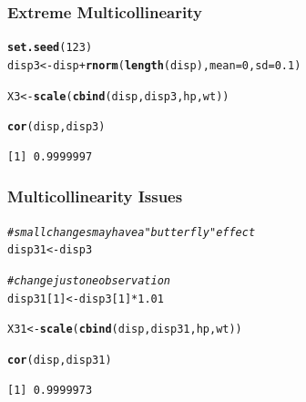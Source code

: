 \documentclass[12pt]{beamer}\usepackage[]{graphicx}\usepackage[]{color}
\makeatletter
\newcommand{\hlnum}[1]{\textcolor[rgb]{0.686,0.059,0.569}{#1}}%
\newcommand{\hlcom}[1]{\textcolor[rgb]{0.678,0.584,0.686}{\textit{#1}}}%
\newcommand{\hlopt}[1]{\textcolor[rgb]{0,0,0}{#1}}%
\newcommand{\hlstd}[1]{\textcolor[rgb]{0.345,0.345,0.345}{#1}}%
\newcommand{\hlkwb}[1]{\textcolor[rgb]{0.69,0.353,0.396}{#1}}%
\newcommand{\hlkwc}[1]{\textcolor[rgb]{0.333,0.667,0.333}{#1}}%
\newcommand{\hlkwd}[1]{\textcolor[rgb]{0.737,0.353,0.396}{\textbf{#1}}}%
\newenvironment{kframe}{%
 \def\at@end@of@kframe{}%
 \ifinner\ifhmode%
  \def\at@end@of@kframe{\end{minipage}}%
  \begin{minipage}{\columnwidth}%
 \fi\fi%
 \def\FrameCommand##1{\hskip\@totalleftmargin \hskip-\fboxsep
 \colorbox{shadecolor}{##1}\hskip-\fboxsep
     \hskip-\linewidth \hskip-\@totalleftmargin \hskip\columnwidth}%
 \MakeFramed {\advance\hsize-\width
   \@totalleftmargin\z@ \linewidth\hsize
   \@setminipage}}%
 {\par\unskip\endMakeFramed%
 \at@end@of@kframe}
\newenvironment{knitrout}{}{} %
\makeatother
\begin{document}

\begin{frame}
\begin{center}
\Huge{}
\end{center}
\end{frame}


\begin{frame}[fragile]
\frametitle{Extreme Multicollinearity}

\begin{knitrout}\footnotesize
{}\color{fgcolor}\begin{kframe}
\begin{alltt}
\hlkwd{set.seed}\hlstd{(}\hlnum{123}\hlstd{)}
\hlstd{disp3} \hlkwb{<-} \hlstd{disp} \hlopt{+} \hlkwd{rnorm}\hlstd{(}\hlkwd{length}\hlstd{(disp),} \hlkwc{mean} \hlstd{=} \hlnum{0}\hlstd{,} \hlkwc{sd} \hlstd{=} \hlnum{0.1}\hlstd{)}

\hlstd{X3} \hlkwb{<-} \hlkwd{scale}\hlstd{(}\hlkwd{cbind}\hlstd{(disp, disp3, hp, wt))}

\hlkwd{cor}\hlstd{(disp, disp3)}
\end{alltt}
\begin{verbatim}
[1] 0.9999997
\end{verbatim}
\end{kframe}
\end{knitrout}

\end{frame}


\begin{frame}[fragile]
\frametitle{Multicollinearity Issues}

\begin{knitrout}\footnotesize
{}\color{fgcolor}\begin{kframe}
\begin{alltt}
\hlcom{# small changes may have a "butterfly" effect}
\hlstd{disp31} \hlkwb{<-} \hlstd{disp3}

\hlcom{# change just one observation}
\hlstd{disp31[}\hlnum{1}\hlstd{]} \hlkwb{<-} \hlstd{disp3[}\hlnum{1}\hlstd{]} \hlopt{*} \hlnum{1.01}

\hlstd{X31} \hlkwb{<-} \hlkwd{scale}\hlstd{(}\hlkwd{cbind}\hlstd{(disp, disp31, hp, wt))}

\hlkwd{cor}\hlstd{(disp, disp31)}
\end{alltt}
\begin{verbatim}
[1] 0.9999973
\end{verbatim}
\end{kframe}
\end{knitrout}

\end{frame}
\end{document}
